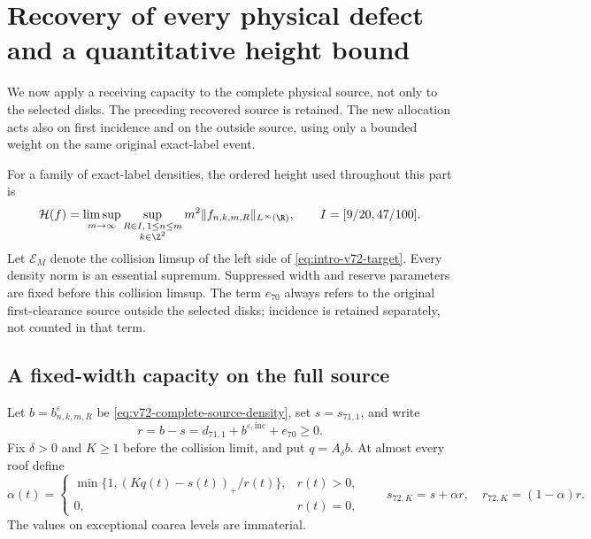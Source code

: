 \section{Recovery of every physical defect and a quantitative height bound}
\label{sec:v72-all-source-recovery}
We now apply a receiving capacity to the complete physical source,
not only to the selected disks. The preceding recovered source is
retained. The new allocation acts also on first incidence and on the
outside source, using only a bounded weight on the same original
exact-label event.

For a family of exact-label densities, the ordered height used
throughout this part is
\begin{equation}\label{eq:v72-ordered-height-definition}
 \mathcal H(f)=\limsup_{m\to\infty}
   \sup_{\substack{R\in I,\,1\le n\le m\\k\in\Z^2}}
                          m^2\|f_{n,k,m,R}\|_{L^\infty(\R)},
 \qquad I=[9/20,47/100].
\end{equation}
Let $\mathcal E_M$ denote the collision limsup of the left side of
\eqref{eq:intro-v72-target}. Every density norm is an essential
supremum. Suppressed width and reserve parameters are fixed before
this collision limsup. The term $e_{70}$ always refers to the
original first-clearance source outside the selected disks; incidence
is retained separately, not counted in that term.

\subsection{A fixed-width capacity on the full source}
Let $b=b^\varepsilon_{n,k,m,R}$ be
\eqref{eq:v72-complete-source-density}, set $s=s_{71,1}$, and write
\begin{equation}\label{eq:v72-original-residual}
 r=b-s=d_{71,1}+b^{\varepsilon,\mathrm{inc}}+e_{70}\ge0.
\end{equation}
Fix $\delta>0$ and $K\ge1$ before the collision limit, and put
$q=A_\delta b$. At almost every roof define
\begin{equation}\label{eq:v72-allocation}
 \alpha(t)=
 \begin{cases}
 \min\{1,(Kq(t)-s(t))_+/r(t)\},&r(t)>0,\\
 0,&r(t)=0,
 \end{cases}
 \qquad s_{72,K}=s+\alpha r,\quad r_{72,K}=(1-\alpha)r.
\end{equation}
The values on exceptional coarea levels are immaterial.

